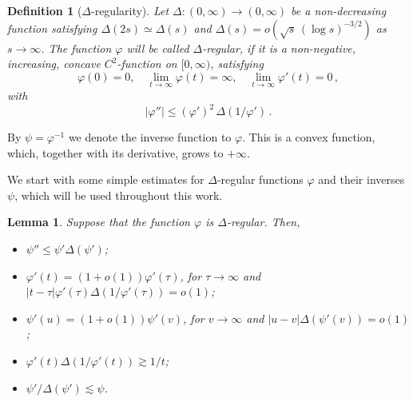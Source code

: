 \documentclass[11pt]{amsart}
\numberwithin{equation}{section}
\newtheorem{lemma}{Lemma}[section]
\newtheorem{definition}{Definition}
\begin{document}
\begin{definition}[$\Delta$-regularity]
Let $\Delta\colon (0, \infty)\to (0, \infty)$ be a non-decreasing function satisfying
$\Delta (2s) \simeq \Delta (s)$ and $ \Delta(s) = o( \sqrt{s}\,(\log s)^{-3/2})$ as $s\to\infty$.
The function $\varphi$ will be called $\Delta$-regular,
if it is a non-negative, increasing, concave $C^2$-function on $[0, \infty)$, satisfying
$$
\varphi (0) = 0,
\quad \lim_{t\to\infty} \varphi (t) = \infty, \quad \lim_{t\to\infty} \varphi' (t)= 0\,,
$$
with
\begin{equation}\label{eq:phi-very-new}
|\varphi''| \le (\varphi')^2\, \Delta(1/\varphi')\,.
\end{equation}
\end{definition}

By $\psi=\varphi^{-1}$ we denote the inverse function to $\varphi$.
This is a convex function, which, together with its derivative, grows to $+\infty$.

We start with some simple estimates for $\Delta$-regular functions $\varphi$ and their inverses
$\psi$, which will be used throughout this work.

\begin{lemma}\label{Lemma-AuxEstimates-new}
Suppose that the function $\varphi$ is $\Delta$-regular.
Then,
\begin{itemize}
\item[{\rm (a)}] $\psi''\le \psi'\Delta(\psi')$;
\item[{\rm (b)}] $\varphi'(t)=(1+o(1))\varphi'(\tau)$, for
$\tau\to\infty$ and
$|t-\tau|\varphi'(\tau)\Delta(1/\varphi'(\tau))=o(1)$;
\item[{\rm (c)}] $\psi'(u) = (1+o(1))\psi'(v)$, for
$v\to\infty$ and $|u-v|\Delta(\psi'(v))=o(1)$;
\item[{\rm (d)}] $\varphi'(t)\Delta(1/\varphi'(t)) \gtrsim 1/t$;
\item[{\rm (e)}] $\psi'/\Delta(\psi') \lesssim \psi$.
\end{itemize}
\end{lemma}
\end{document}
